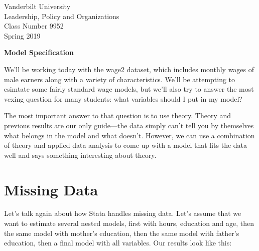 \documentclass[12pt]{article}
\begin{document}
\thispagestyle{empty}%


\setlength{\parskip}{1ex plus 0.5ex minus 0.2ex}

\setcounter{secnumdepth}{-2}



\begin{flushleft}
Vanderbilt University\\Leadership, Policy and Organizations\\Class Number 9952\\ Spring 2019
\end{flushleft}

\begin{center}
\textbf{Model Specification}
\end{center}

We'll be working today with the wage2 dataset, which includes monthly
wages of male earners along with a variety of characteristics. We'll
be attempting to esimtate some fairly standard wage models, but we'll
also try to answer the most vexing question for many students: what
variables should I put in my model?

The most important answer to that question is to use theory. Theory
and previous results are our only guide---the data simply can't tell
you by themselves what belongs in the model and what doesn't. However,
we can  use a combination of theory and applied data analysis to come
up with a model that fits the data well and says something interesting
about theory. 

\section{Missing Data}
\label{sec:missing-data}

Let's talk again about how Stata
handles missing data. Let's assume that we want to estimate several
nested models, first with hours, education and age, then the same
model with mother's education, then the same model with father's
education, then a final model with all variables. Our results look
like this: 
\end{document}
